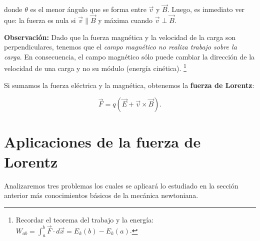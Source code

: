 donde $\theta$ es el menor ángulo que se forma entre $\vec{v}$ y $\vec{B}$. Luego, es inmediato ver que: la fuerza es nula si $\vec{v} \parallel \vec{B}$ y máxima cuando $\vec{v} \perp \vec{B}$.

\textbf{Observación:} Dado que la fuerza magnética y la velocidad de la carga son perpendiculares, tenemos que el \textit{campo magnético no realiza trabajo sobre la carga}. En consecuencia, el campo magnético sólo puede cambiar la dirección de la velocidad de una carga y no su módulo (energía cinética). \footnote{Recordar el teorema del trabajo y la energía: $W_{ab} = \int_a^b \vec{F} \cdot d\vec{x} = E_k(b) - E_k(a)$.}

Si sumamos la fuerza eléctrica y la magnética, obtenemos la \textbf{fuerza de Lorentz}:
\begin{shaded}
    $$\vec{F} = q (\vec{E} + \vec{v} \times \vec{B}).$$
\end{shaded}

\section{Aplicaciones de la fuerza de Lorentz}

Analizaremos tres problemas los cuales se aplicará lo estudiado en la sección anterior más conocimientos básicos de la mecánica newtoniana.

